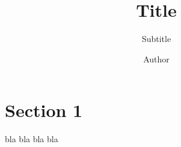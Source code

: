 \documentclass{beamer}
\title{Title}
\subtitle{Subtitle}
\author{Author}
\date{}
\begin{document}
\begin{frame}
    \maketitle
\end{frame}

\section{Section 1}

\begin{frame}{bla}
    bla bla bla
\end{frame}
\end{document}
